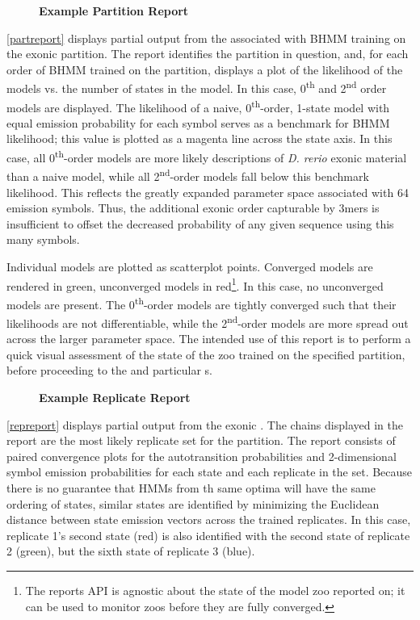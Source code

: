 \begin{figure}[!h]
    \caption{{\bf Example \protect{} Partition Report}}
    \label{partreport}
\end{figure}

\autoref{partreport} displays partial output from the  associated with BHMM training on the exonic partition. The report identifies the partition in question, and, for each order of BHMM trained on the partition, displays a plot of the likelihood of the models vs. the number of states in the model. In this case, 0\textsuperscript{th} and 2\textsuperscript{nd} order models are displayed. The likelihood of a naive, 0\textsuperscript{th}-order, 1-state model with equal emission probability for each symbol serves as a benchmark for BHMM likelihood; this value is plotted as a magenta line across the state axis. In this case, all 0\textsuperscript{th}-order models are more likely descriptions of \textit{D. rerio} exonic material than a naive model, while all 2\textsuperscript{nd}-order models fall below this benchmark likelihood. This reflects the greatly expanded parameter space associated with 64 emission symbols. Thus, the additional exonic order capturable by 3mers is insufficient to offset the decreased probability of any given sequence using this many symbols.

Individual models are plotted as scatterplot points. Converged models are rendered in green, unconverged models in red\footnote{The reports API is agnostic about the state of the model zoo reported on; it can be used to monitor zoos before they are fully converged.}. In this case, no unconverged models are present. The 0\textsuperscript{th}-order models are tightly converged such that their likelihoods are not differentiable, while the 2\textsuperscript{nd}-order models are more spread out across the larger parameter space. The intended use of this report is to perform a quick visual assessment of the state of the zoo trained on the specified partition, before proceeding to the  and particular s.

\begin{figure}[!h]
    \caption{{\bf Example \protect{} Replicate Report}}
    \label{repreport}
\end{figure}

\autoref{repreport} displays partial output from the exonic . The chains displayed in the report are the most likely replicate set for the partition. The report consists of paired convergence plots for the autotransition probabilities and 2-dimensional symbol emission probabilities for each state and each replicate in the set. Because there is no guarantee that HMMs from th same optima will have the same ordering of states, similar states are identified by minimizing the Euclidean distance between state emission vectors across the trained replicates. In this case, replicate 1's second state (red) is also identified with the second state of replicate 2 (green), but the sixth state of replicate 3 (blue).

